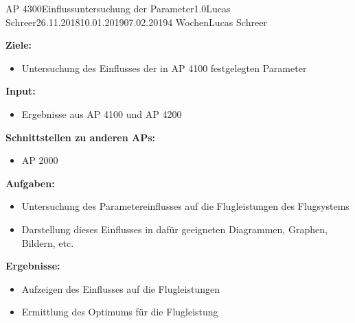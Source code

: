 \begin{appendix}
\clearpage
\begin{wpd}{AP 4300}{Einflussuntersuchung der Parameter}{1.0}{Lucas Schreer}{26.11.2018}{10.01.2019}{07.02.2019}{4 Wochen}{Lucas Schreer}
    {
    \textbf{Ziele:}
    \begin{itemize}
        \item Untersuchung des Einflusses der in AP 4100 festgelegten Parameter
    \end{itemize}
    \textbf{Input:}
    \begin{itemize}
        \item Ergebnisse aus AP 4100 und AP 4200
    \end{itemize}
    \textbf{Schnittstellen zu anderen APs:}
    \begin{itemize}
        \item AP 2000
    \end{itemize}
    \textbf{Aufgaben:}
    \begin{itemize}
        \item Untersuchung des Parametereinflusses auf die Flugleistungen des Flugsystems
        \item Darstellung dieses Einflusses in dafür geeigneten Diagrammen, Graphen, Bildern, etc.
    \end{itemize}
    \textbf{Ergebnisse:}
    \begin{itemize}
        \item Aufzeigen des Einflusses auf die Flugleistungen
        \item Ermittlung des Optimums für die Flugleistung
    \end{itemize}
    }
\end{wpd}



\end{appendix}
